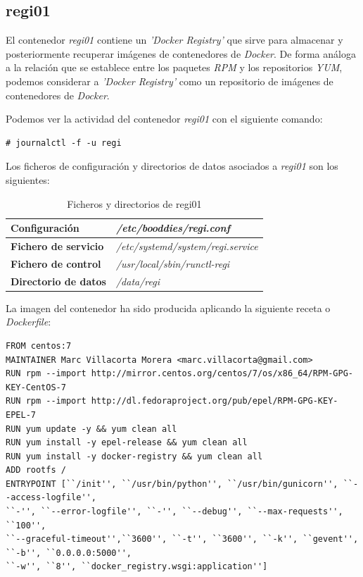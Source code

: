 \documentclass[a4paper,12pt,spanish,final]{epsc_tfc_pfc}
\begin{document}
\subsection{regi01}

El contenedor \emph{regi01} contiene un \emph{'Docker Registry'} que sirve para almacenar y posteriormente recuperar imágenes de contenedores de \emph{Docker}. De forma análoga a la relación que se establece entre los paquetes \emph{RPM} y los repositorios \emph{YUM}, podemos considerar a \emph{'Docker Registry'} como un repositorio de imágenes de contenedores de \emph{Docker}.

Podemos ver la actividad del contenedor \emph{regi01} con el siguiente comando:\\

\begin{lstlisting}[style=dnsmasq]
# journalctl -f -u regi
\end{lstlisting}

Los ficheros de configuración y directorios de datos asociados a \emph{regi01} son los siguientes:

\begin{table}[h]

  \centering

  \begin{tabular}{ll}
    \toprule
    \textbf{Configuración}        & \textit{/etc/booddies/regi.conf}          \\
    \midrule
    \rowcolor[HTML]{EFEFEF}
    \textbf{Fichero de servicio}  & \textit{/etc/systemd/system/regi.service} \\
    \midrule
    \textbf{Fichero de control}   & \textit{/usr/local/sbin/runctl-regi}      \\
    \midrule
    \rowcolor[HTML]{EFEFEF}
    \textbf{Directorio de datos}  & \textit{/data/regi}                       \\
    \bottomrule
  \end{tabular}

  \caption{Ficheros y directorios de regi01}

\end{table}

La imagen del contenedor ha sido producida aplicando la siguiente receta o \emph{Dockerfile}:\\

\begin{lstlisting}[style=dnsmasq]
FROM centos:7
MAINTAINER Marc Villacorta Morera <marc.villacorta@gmail.com>
RUN rpm --import http://mirror.centos.org/centos/7/os/x86_64/RPM-GPG-KEY-CentOS-7
RUN rpm --import http://dl.fedoraproject.org/pub/epel/RPM-GPG-KEY-EPEL-7
RUN yum update -y && yum clean all
RUN yum install -y epel-release && yum clean all
RUN yum install -y docker-registry && yum clean all
ADD rootfs /
ENTRYPOINT [``/init'', ``/usr/bin/python'', ``/usr/bin/gunicorn'', ``--access-logfile'',
``-'', ``--error-logfile'', ``-'', ``--debug'', ``--max-requests'', ``100'',
``--graceful-timeout'',``3600'', ``-t'', ``3600'', ``-k'', ``gevent'', ``-b'', ``0.0.0.0:5000'',
``-w'', ``8'', ``docker_registry.wsgi:application'']
\end{lstlisting}
\end{document}
